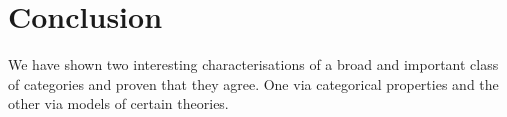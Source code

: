 \section{Conclusion}
\label{sec:conclusion}

We have shown two interesting characterisations of a broad and important class of categories and proven that they agree. One via categorical properties and the other via models of certain theories. 

